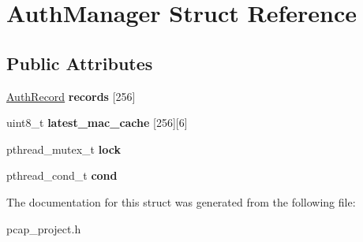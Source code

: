 \hypertarget{structAuthManager}{}\section{Auth\+Manager Struct Reference}
\label{structAuthManager}
\subsection*{Public Attributes}
\begin{DoxyCompactItemize}
\item 
\mbox{\label{structAuthManager_a0802613f151b2f7bb3151bf3339d1407}} 
\mbox{\hyperlink{structAuthRecord}{Auth\+Record}} {\bfseries records} \mbox{[}256\mbox{]}
\item 
\mbox{\label{structAuthManager_afc692d3eb81e43606c55f0a4df33f46c}} 
uint8\+\_\+t {\bfseries latest\+\_\+mac\+\_\+cache} \mbox{[}256\mbox{]}\mbox{[}6\mbox{]}
\item 
\mbox{\label{structAuthManager_aeed2f2e4ccb28862064095550863f788}} 
pthread\+\_\+mutex\+\_\+t {\bfseries lock}
\item 
\mbox{\label{structAuthManager_ab5a5b5a7b3b1e928604e800e750e4549}} 
pthread\+\_\+cond\+\_\+t {\bfseries cond}
\end{DoxyCompactItemize}


The documentation for this struct was generated from the following file\+:\begin{DoxyCompactItemize}
\item 
pcap\+\_\+project.\+h\end{DoxyCompactItemize}
